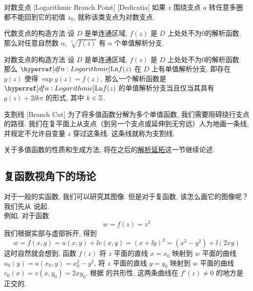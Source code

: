         \begin{dfn}
            {对数支点}
            [Logarithmic Branch Point]
            [Dedicatia]
            如果 \(z\) 围绕支点 \(a\) 转任意多圈都不能回到它的初值 \(z_0\), 就称该类支点为对数支点.
        \end{dfn}

        \begin{ppt}
            {代数支点的构造方法}
            设 \(D\) 是单连通区域,  \(f(z)\) 是 \(D\) 上处处不为0的解析函数. 那么对任意自然数 \(n\),  \(\sqrt[n]{f(z)}\) 有 \(n\) 个单值解析分支. 
        \end{ppt}

        \begin{ppt}
            {对数支点的构造方法}
            设 \(D\) 是单连通区域,  \(f(z)\) 是 \(D\) 上处处不为0的解析函数. 那么 \(\Ln f(z)\) 在 \(D\) 上有单值解析分支, 即存在 \(g(z)\) 使得 \(\exp g(z)=f(z)\), 那么一个解析函数是 \(\Ln f(z)\) 的单值解析分支当且仅当其具有 \(g(z)+2\ii k\pi\) 的形式, 其中 \(k\in\operatorname{\mathbb{Z}}\).
        \end{ppt}

        \begin{dfn}
            {支割线}
            [Branch Cut]
            为了将多值函数分解为多个单值函数, 我们需要阻碍绕行支点的路径. 我们在复平面上从支点（到另一个支点或延伸到无穷远）人为地画一条线, 并规定不允许自变量 \(z\) 穿过这条线. 这条线就称为支割线. 
        \end{dfn}

        \begin{rmk}
            [Dedicatia]
            关于多值函数的性质和生成方法, 将在之后的\hyperref[dfn:Analytic-Continuation]{解析延拓}这一节继续论述.
        \end{rmk}
    
    \subsection{复函数视角下的场论}

        \bysorry

        对于一般的实函数, 我们可以研究其图像. 但是对于复函数, 该怎么画它的图像呢？我们先从\Analytic{} 说起. \\
        例如, 对于函数
        \[w=f(z)=z^2\]
        我们根据实部与虚部拆开, 得到
        \[w=f(x,y)=u(x,y)+\ii v(x,y)=(x+\ii y)^2=(x^2-y^2)+\ii(2xy)\]
        这时自然就会想到, 函数 \(f(z)\) 将 \(z\) 平面的直线 \(x=x_0\) 映射到 \(w\) 平面的曲线 \(u_0(y)=u(x_0,y)=x_0^2-y^2\), 将 \(z\) 平面的直线 \(y=y_0\) 映射到 \(w\) 平面的曲线 \(v_0(x)=v(x,y_0)=2xy_0\). 根据\Analytic{} 的共形性, 这两条曲线在 \(f'(z)\neq 0\) 的地方是正交的. 

